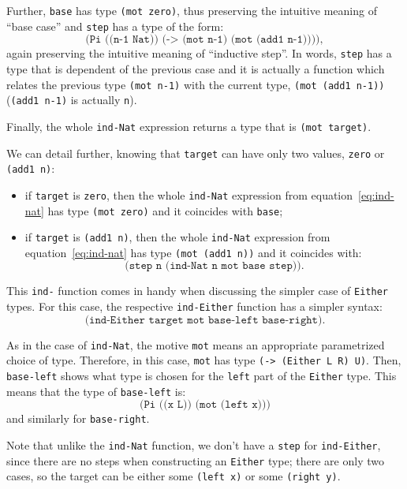 Further, \texttt{base} has type \texttt{(mot zero)}, thus preserving the
intuitive meaning of ``base case'' and \texttt{step} has a type of the form:
\[
  \texttt{(Pi ((n-1 Nat)) (-> (mot n-1) (mot (add1 n-1))))},
\]
again preserving the intuitive meaning of ``inductive step''. In words,
\texttt{step} has a type that is dependent of the previous case and it
is actually a function which relates the previous type \texttt{(mot n-1)}
with the current type, \texttt{(mot (add1 n-1))} (\texttt{(add1 n-1)} is
actually \texttt{n}).

Finally, the whole \texttt{ind-Nat} expression returns a type that is
\texttt{(mot target)}.

We can detail further, knowing that \texttt{target} can have only
two values, \texttt{zero} or \texttt{(add1 n)}:
\begin{itemize}
\item if \texttt{target} is \texttt{zero}, then the whole \texttt{ind-Nat}
  expression from equation~\eqref{eq:ind-nat}
  has type \texttt{(mot zero)} and it coincides with \texttt{base};
\item if \texttt{target} is \texttt{(add1 n)}, then the whole \texttt{ind-Nat}
  expression from equation~\eqref{eq:ind-nat} has type \texttt{(mot (add1 n))}
  and it coincides with:
  \[
    \texttt{(step \ n \ (ind-Nat \ n \ mot \ base \ step))}.
  \]
\end{itemize}

\vspace{0.3cm}

This \texttt{ind-} function comes in handy when discussing the
simpler case of \texttt{Either} types. For this case, the
respective \texttt{ind-Either} function has a simpler syntax:
\begin{equation}
  \label{eq:ind-either}
  \texttt{(ind-Either \ target \ mot \ base-left \ base-right)}.
\end{equation}

As in the case of \texttt{ind-Nat}, the motive \texttt{mot} means
an appropriate parametrized choice of type. Therefore, in this
case, \texttt{mot} has type \texttt{(-> (Either L R) U)}. Then,
\texttt{base-left} shows what type is chosen for the \texttt{left}
part of the \texttt{Either} type. This means that the type of
\texttt{base-left} is:
\[
  \texttt{(Pi ((x L)) (mot (left x)))}
\]
and similarly for \texttt{base-right}.

Note that unlike the \texttt{ind-Nat} function, we don't have a
\texttt{step} for \texttt{ind-Either}, since there are no steps
when constructing an \texttt{Either} type; there are only two cases,
so the target can be either some \texttt{(left x)} or some
\texttt{(right y)}.

